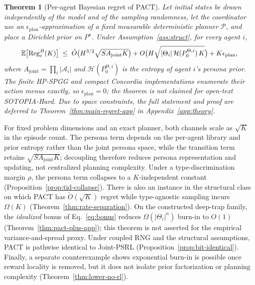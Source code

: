 \documentclass[letterpaper]{article} %
\newtheorem{theorem}{Theorem}[section]
\begin{document}
\begin{theorem}[Per-agent Bayesian regret of PACT]
\label{thm:regret-main}
Let initial states be drawn independently of the model and of the sampling randomness, let the coordinator use an $\epsilon_{\mathrm{plan}}$-approximation of a fixed measurable deterministic planner $\mathcal P$, and place a Dirichlet prior on $P^\star$. Under Assumption~\ref{ass:struct}, for every agent $i$,
\begin{equation}\label{eq:regret-main}\resizebox{0.9\linewidth}{!}{$\displaystyle
\mathbb E\big[\mathrm{Reg}_i^B(K)\big] \;\le\; \tilde O\big(H^{3/2}\sqrt{S A_{\mathrm{joint}} K}\big) + O\big(H\sqrt{|\Theta_i|\,\mathcal H(P_0^{\Theta,i})\,K}\big) + K\epsilon_{\mathrm{plan}}, $}
\end{equation}
where $A_{\mathrm{joint}}=\prod_i|\mathcal A_i|$ and $\mathcal H(P_0^{\Theta,i})$ is the entropy of agent $i$'s persona prior. The finite HP-SPGG and compact Concordia implementations enumerate their action menus exactly, so $\epsilon_{\mathrm{plan}}=0$; the theorem is not claimed for open-text SOTOPIA-Hard. Due to space constraints, the full statement and proof are deferred to Theorem~\ref{thm:main-regret-app} in Appendix~\ref{app:theory}.
\end{theorem}

For fixed problem dimensions and an exact planner, both channels scale as $\sqrt K$ in the episode count. The persona term depends on the per-agent library and prior entropy rather than the joint persona space, while the transition term retains $\sqrt{S A_{\mathrm{joint}}K}$; decoupling therefore reduces persona representation and updating, not centralized planning complexity. Under a type-discrimination margin $\rho$, the persona term collapses to a $K$-independent constant (Proposition~\ref{prop:tid-collapse}). There is also an instance in the structural class on which PACT has $\tilde O(\sqrt K)$ regret while type-agnostic sampling incurs $\Omega(K)$ (Theorem~\ref{thm:rate-separation}). On the constructed deep-trap family, the \emph{idealized} bonus of Eq.~\eqref{eq:bonus} reduces $\Omega(|\Theta_i|^n)$ burn-in to $O(1)$ (Theorem~\ref{thm:pact-plus-app}); this theorem is not asserted for the empirical variance-and-spread proxy. Under coupled RNG and the structural assumptions, PACT is pathwise identical to Joint-PSRL (Proposition~\ref{prop:bit-identical}). Finally, a separate counterexample shows exponential burn-in is possible once reward locality is removed, but it does not isolate prior factorization or planning complexity (Theorem~\ref{thm:lower-no-rl}).
\end{document}

